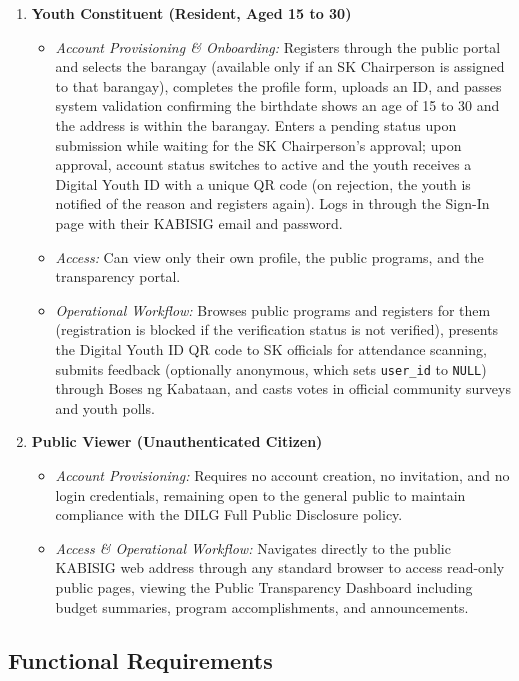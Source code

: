\begin{enumerate}
    \item \textbf{Youth Constituent (Resident, Aged 15 to 30)}
    \begin{itemize}
        \item \textit{Account Provisioning \& Onboarding:} Registers through the public portal and selects the barangay (available only if an SK Chairperson is assigned to that barangay), completes the profile form, uploads an ID, and passes system validation confirming the birthdate shows an age of 15 to 30 and the address is within the barangay. Enters a pending status upon submission while waiting for the SK Chairperson's approval; upon approval, account status switches to active and the youth receives a Digital Youth ID with a unique QR code (on rejection, the youth is notified of the reason and registers again). Logs in through the Sign-In page with their KABISIG email and password.
        \item \textit{Access:} Can view only their own profile, the public programs, and the transparency portal.
        \item \textit{Operational Workflow:} Browses public programs and registers for them (registration is blocked if the verification status is not verified), presents the Digital Youth ID QR code to SK officials for attendance scanning, submits feedback (optionally anonymous, which sets \texttt{user\_id} to \texttt{NULL}) through Boses ng Kabataan, and casts votes in official community surveys and youth polls.
    \end{itemize}

    \item \textbf{Public Viewer (Unauthenticated Citizen)}
    \begin{itemize}
        \item \textit{Account Provisioning:} Requires no account creation, no invitation, and no login credentials, remaining open to the general public to maintain compliance with the DILG Full Public Disclosure policy.
        \item \textit{Access \& Operational Workflow:} Navigates directly to the public KABISIG web address through any standard browser to access read-only public pages, viewing the Public Transparency Dashboard including budget summaries, program accomplishments, and announcements.
    \end{itemize}
\end{enumerate}
\vspace{5mm}

\subsection{Functional Requirements}
\label{subsec:functional_requirements}

